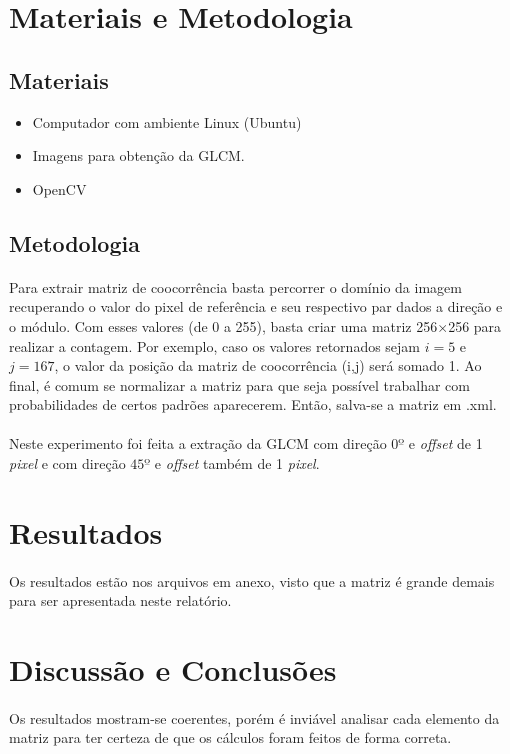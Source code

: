 \documentclass[conference, harvard, brazil, english]{sbatex}
\begin{document}
	
	\section{Materiais e Metodologia}
		\subsection{Materiais}
			\begin{itemize}
				\item Computador com ambiente Linux (Ubuntu)
				\item Imagens para obtenção da GLCM.
				\item OpenCV
			\end{itemize}
		\subsection{Metodologia}
			\paragraph{}
			Para extrair matriz de coocorrência basta percorrer o domínio da imagem recuperando o valor do pixel de referência e seu respectivo par dados a direção e o módulo. Com esses valores (de 0 a 255), basta criar uma matriz 256$\times$256 para realizar a contagem. Por exemplo, caso os valores retornados sejam $i = 5$ e $j = 167$, o valor da posição da matriz de coocorrência (i,j) será somado 1. Ao final, é comum se normalizar a matriz para que seja possível trabalhar com probabilidades de certos padrões aparecerem. Então, salva-se a matriz em .xml.
			\paragraph{}
			Neste experimento foi feita a extração da GLCM com direção $0º$ e \textit{offset} de 1 \textit{pixel} e com direção $45º$ e \textit{offset} também de 1 \textit{pixel}.
			
		\section{Resultados}
			\paragraph{}
			Os resultados estão nos arquivos em anexo, visto que a matriz é grande demais para ser apresentada neste relatório.
		\section{Discussão e Conclusões}
			\paragraph{}
			Os resultados mostram-se coerentes, porém é inviável analisar cada elemento da matriz para ter certeza de que os cálculos foram feitos de forma correta.
			
		
\end{document}
